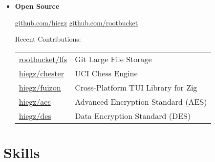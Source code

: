 \documentclass[]{article}
\begin{document}
\begin{itemize}[leftmargin=0.15in, rightmargin=0.15in, label={}]
    \item {\large\bfseries Open Source}

        \:\: { \href{https://github.com/hiegz}{\ttfamily github.com/hiegz}}
        \:\: { \href{https://github.com/rootbucket}{\ttfamily github.com/rootbucket}}

        \vspace{7pt}
        \hspace{5pt}
        Recent Contributions:

        \hspace{20pt}
        \begin{tabular}{@{}lp{8cm}}
            \href{https://github.com/rootbucket/lfs}{\ttfamily rootbucket/lfs} & Git Large File Storage \\[3pt]
            \href{https://github.com/hiegz/chester}{\ttfamily hiegz/chester}   & UCI Chess Engine \\[3pt]
            \href{https://github.com/hiegz/fuizon}{\ttfamily hiegz/fuizon}     & Cross-Platform TUI Library for Zig \\[3pt]
            \href{https://github.com/hiegz/aes}{\ttfamily hiegz/aes}           & Advanced Encryption Standard (AES) \\[3pt]
            \href{https://github.com/hiegz/des}{\ttfamily hiegz/des}           & Data Encryption Standard (DES)
        \end{tabular}
\end{itemize}

\section{Skills}
\end{document}
